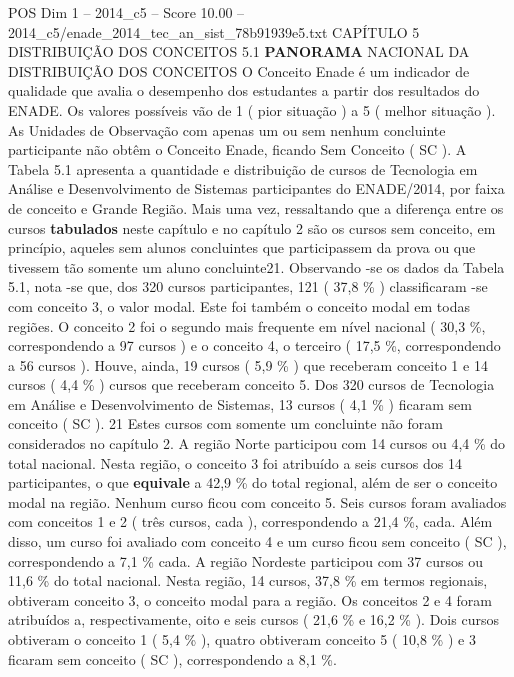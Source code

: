 \begin{textsample}{POS Dim 1 – 2014\_c5 – Score 10.00 – 2014\_c5/enade\_2014\_tec\_an\_sist\_78b91939e5.txt}  \label{ex:f1_pos_104}
CAPÍTULO 5 DISTRIBUIÇÃO DOS CONCEITOS 5.1 \textbf{PANORAMA} NACIONAL DA DISTRIBUIÇÃO DOS CONCEITOS O Conceito Enade é um indicador de qualidade que avalia o desempenho dos estudantes a partir dos resultados do ENADE.
Os valores possíveis vão de 1 ( pior situação ) a 5 ( melhor situação ).
As Unidades de Observação com apenas um ou sem nenhum concluinte participante não obtêm o Conceito Enade, ficando Sem Conceito ( SC ).
A Tabela 5.1 apresenta a quantidade e distribuição de cursos de Tecnologia em Análise e Desenvolvimento de Sistemas participantes do ENADE/2014, por faixa de conceito e Grande Região.
Mais uma vez, ressaltando que a diferença entre os cursos \textbf{tabulados} neste capítulo e no capítulo 2 são os cursos sem conceito, em princípio, aqueles sem alunos concluintes que participassem da prova ou que tivessem tão somente um aluno concluinte21.
Observando -se os dados da Tabela 5.1, nota -se que, dos 320 cursos participantes, 121 ( 37,8 \% ) classificaram -se com conceito 3, o valor modal.
Este foi também o conceito modal em todas regiões.
O conceito 2 foi o segundo mais frequente em nível nacional ( 30,3 \%, correspondendo a 97 cursos ) e o conceito 4, o terceiro ( 17,5 \%, correspondendo a 56 cursos ).
Houve, ainda, 19 cursos ( 5,9 \% ) que receberam conceito 1 e 14 cursos ( 4,4 \% ) cursos que receberam conceito 5.
Dos 320 cursos de Tecnologia em Análise e Desenvolvimento de Sistemas, 13 cursos ( 4,1 \% ) ficaram sem conceito ( SC ). 21 Estes cursos com somente um concluinte não foram considerados no capítulo 2.
A região Norte participou com 14 cursos ou 4,4 \% do total nacional.
Nesta região, o conceito 3 foi atribuído a seis cursos dos 14 participantes, o que \textbf{equivale} a 42,9 \% do total regional, além de ser o conceito modal na região.
Nenhum curso ficou com conceito 5.
Seis cursos foram avaliados com conceitos 1 e 2 ( três cursos, cada ), correspondendo a 21,4 \%, cada.
Além disso, um curso foi avaliado com conceito 4 e um curso ficou sem conceito ( SC ), correspondendo a 7,1 \% cada.
A região Nordeste participou com 37 cursos ou 11,6 \% do total nacional.
Nesta região, 14 cursos, 37,8 \% em termos regionais, obtiveram conceito 3, o conceito modal para a região.
Os conceitos 2 e 4 foram atribuídos a, respectivamente, oito e seis cursos ( 21,6 \% e 16,2 \% ).
Dois cursos obtiveram o conceito 1 ( 5,4 \% ), quatro obtiveram conceito 5 ( 10,8 \% ) e 3 ficaram sem conceito ( SC ), correspondendo a 8,1 \%.

\end{textsample}
